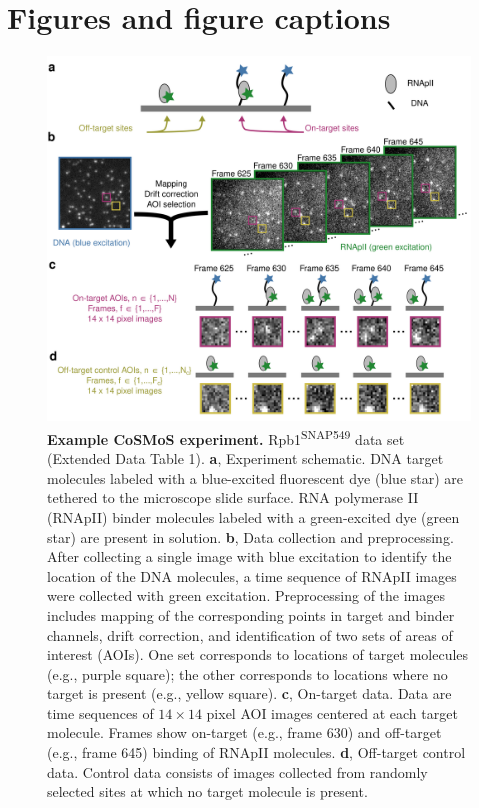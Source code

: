 \clearpage
\newpage
\section*{Figures and figure captions}
\pagebreak

\renewcommand{\figurename}{Fig.}

\begin{figure}[h]
\centering
\includegraphics[width=\textwidth]{figures/figure1/figure1.png}
\caption{\textbf{Example CoSMoS experiment.} Rpb1\textsuperscript{SNAP549} data set (Extended Data Table 1). \textbf{a}, Experiment schematic. DNA target molecules labeled with a blue-excited fluorescent dye (blue star) are tethered to the microscope slide surface. RNA polymerase II (RNApII) binder molecules labeled with a green-excited dye (green star) are present in solution. \textbf{b}, Data collection and preprocessing. After collecting a single image with blue excitation to identify the location of the DNA molecules, a time sequence of RNApII images were collected with green excitation.  Preprocessing of the images includes mapping of the corresponding points in target and binder channels, drift correction, and identification of two sets of areas of interest (AOIs).  One set corresponds to locations of target molecules (e.g., purple square); the other corresponds to locations where no target is present (e.g., yellow square). \textbf{c}, On-target data. Data are time sequences of $14 \times 14$ pixel AOI images centered at each target molecule. Frames show on-target (e.g., frame 630) and off-target (e.g., frame 645) binding of RNApII molecules. \textbf{d}, Off-target control data. Control data consists of images collected from randomly selected sites at which no target molecule is present. }
\label{fig:cosmos_experiment}
\end{figure}

